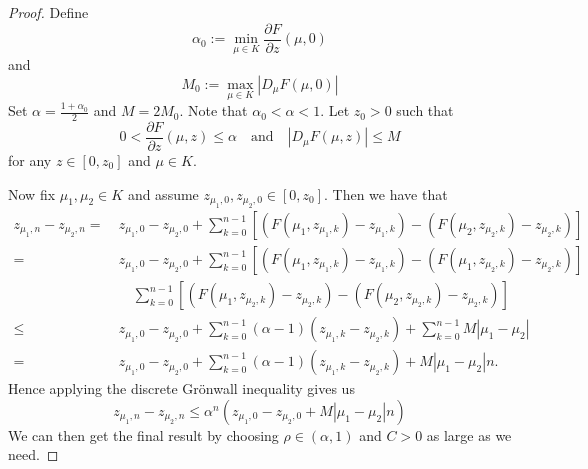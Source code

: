 \begin{proof}
	Define 
	\begin{equation*}
		\alpha_0 := \min_{\mu\in K } \frac{\partial F}{\partial z} (\mu, 0) 
	\end{equation*} 
	and 
	\begin{equation*}
		M_0 := \max_{\mu\in K} \left| D_\mu F (\mu, 0) \right|
	\end{equation*}
	Set \(\alpha = \frac{1 + \alpha_0}{2}\) and \(M = 2M_0\). Note that \(\alpha_0 < \alpha < 1\). Let \(z_0 > 0\) such that 
	\begin{equation*}
		0 < \frac{\partial F}{\partial z} (\mu, z) \leq \alpha \quad \text{and} \quad \left| D_\mu F (\mu, z) \right| \leq M
	\end{equation*}
	for any \(z \in [0,z_0]\) and \(\mu \in K\). 
	
	Now fix \(\mu_1,\mu_2\in K\) and assume \(z_{\mu_1, 0}, z_{\mu_2,0} \in [0,z_0]\). Then we have that 
	\begin{align*}
		z_{\mu_1, n} - z_{\mu_2, n}=\ &z_{\mu_1, 0}- z_{\mu_2, 0} + \sum_{k=0}^{n-1} [(F(\mu_1, z_{\mu_1,k} ) - z_{\mu_1, k}) - (F(\mu_2, z_{\mu_2,k} ) - z_{\mu_2, k})]\\
		=\ &z_{\mu_1, 0}- z_{\mu_2, 0} + \sum_{k=0}^{n-1} [(F(\mu_1, z_{\mu_1,k} ) - z_{\mu_1, k}) - (F(\mu_1, z_{\mu_2,k} ) - z_{\mu_2, k})] \\
		&\quad\sum_{k=0}^{n-1} [(F(\mu_1, z_{\mu_2,k} ) - z_{\mu_2, k}) - (F(\mu_2, z_{\mu_2,k} ) - z_{\mu_2, k})] \\
		\leq\ &z_{\mu_1, 0}- z_{\mu_2, 0} + \sum_{k=0}^{n-1} (\alpha - 1) (z_{\mu_1, k}- z_{\mu_2, k}) +\sum_{k=0}^{n-1} M|\mu_1 - \mu_2| \\
		=\ &z_{\mu_1, 0}- z_{\mu_2, 0} + \sum_{k=0}^{n-1} (\alpha - 1) (z_{\mu_1, k}- z_{\mu_2, k}) +M|\mu_1 - \mu_2| n.
	\end{align*}
	Hence applying the discrete Gr\"onwall inequality gives us
	\begin{equation*}
		z_{\mu_1, n} - z_{\mu_2, n} \leq \alpha^n(z_{\mu_1, 0}- z_{\mu_2, 0} + M |\mu_1-\mu_2| n)
	\end{equation*}
	We can then get the final result by choosing \(\rho \in (\alpha, 1)\) and \(C>0\) as large as we need.
\end{proof}

